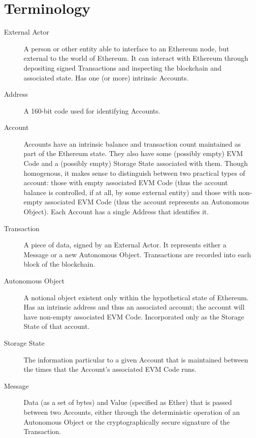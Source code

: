 \documentclass[9pt,oneside]{amsart}
\begin{document}
\appendix

\section{Terminology} \label{ch:Terminology}

\begin{description}
\item[External Actor] A person or other entity able to interface to an Ethereum node, but external to the world of Ethereum. It can interact with Ethereum through depositing signed Transactions and inspecting the blockchain and associated state. Has one (or more) intrinsic Accounts.

\item[Address] A 160-bit code used for identifying Accounts.

\item[Account] Accounts have an intrinsic balance and transaction count maintained as part of the Ethereum state. They also have some (possibly empty) EVM Code and a (possibly empty) Storage State associated with them. Though homogenous, it makes sense to distinguish between two practical types of account: those with empty associated EVM Code (thus the account balance is controlled, if at all, by some external entity) and those with non-empty associated EVM Code (thus the account represents an Autonomous Object). Each Account has a single Address that identifies it.

\item[Transaction] A piece of data, signed by an External Actor. It represents either a Message or a new Autonomous Object. Transactions are recorded into each block of the blockchain.

\item[Autonomous Object] A notional object existent only within the hypothetical state of Ethereum. Has an intrinsic address and thus an associated account; the account will have non-empty associated EVM Code. Incorporated only as the Storage State of that account.

\item[Storage State] The information particular to a given Account that is maintained between the times that the Account's associated EVM Code runs.

\item[Message] Data (as a set of bytes) and Value (specified as Ether) that is passed between two Accounts, either through the deterministic operation of an Autonomous Object or the cryptographically secure signature of the Transaction.


\end{description}
\end{document}
